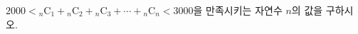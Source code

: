 $2000<{}_n\mathrm{C}_1+{}_n\mathrm{C}_2+{}_n\mathrm{C}_3+\cdots+{}_n\mathrm{C}_n<3000$을 만족시키는 자연수 $n$의 값을 구하시오.
